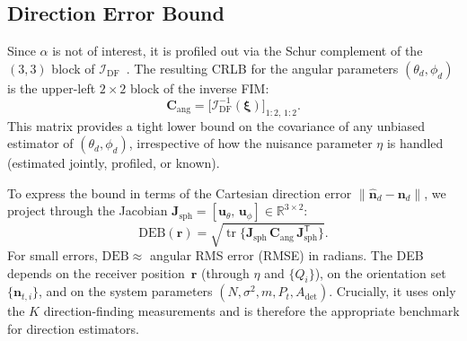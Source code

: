 \documentclass[journal]{IEEEtran}
\newcommand{\added}[1]{{\color{blue}#1}}
\begin{document}
\added{\subsection{Direction Error Bound}
\label{subsec:DEB}
Since $\alpha$ is not of interest, it is profiled out via the Schur complement of the $(3,3)$ block of $\mathcal{I}_{\mathrm{DF}}$~\cite{Kay1993}.  The resulting CRLB for the angular parameters $(\theta_d,\phi_d)$ is the upper-left $2\times2$ block of the inverse FIM:
\begin{equation}
\mathbf{C}_{\mathrm{ang}} = \bigl[\mathcal{I}_{\mathrm{DF}}^{-1}(\boldsymbol\xi)\bigr]_{1:2,\,1:2}.
\label{eq:C_ang}
\end{equation}
This matrix provides a tight lower bound on the covariance of any unbiased estimator of $(\theta_d,\phi_d)$, irrespective of how the nuisance parameter $\eta$ is handled (estimated jointly, profiled, or known).

To express the bound in terms of the Cartesian direction error $\lVert\hat{\mathbf{n}}_d - \mathbf{n}_d\rVert$, we project through the Jacobian $\mathbf{J}_{\mathrm{sph}}=[\mathbf{u}_\theta,\,\mathbf{u}_\phi]\in\mathbb{R}^{3\times2}$:
\begin{equation}
\mathrm{DEB}(\mathbf{r})
= \sqrt{\operatorname{tr}\!\bigl\{\mathbf{J}_{\mathrm{sph}}\,\mathbf{C}_{\mathrm{ang}}\,\mathbf{J}_{\mathrm{sph}}^{\mathsf T}\bigr\}}.
\label{eq:DEB}
\end{equation}
For small errors, $\mathrm{DEB}\approx$ angular RMS error (RMSE) in radians. The DEB depends on the receiver position~$\mathbf{r}$ (through $\eta$ and $\{Q_i\}$), on the orientation set $\{\mathbf{n}_{t,i}\}$, and on the system parameters $(N,\sigma^2,m,P_t,A_{\mathrm{det}})$.  Crucially, it uses only the $K$ direction-finding measurements and is therefore the appropriate benchmark for direction estimators.}
\end{document}
